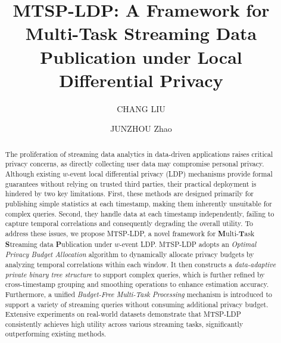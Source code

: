 \documentclass[acmsmall]{acmart}
\begin{document}
\title{MTSP-LDP: A Framework for Multi-Task Streaming Data
Publication under Local Differential Privacy}


\author{CHANG LIU}

\author{JUNZHOU Zhao}

\renewcommand{\shortauthors}{Liu and Zhao}

\begin{abstract}
The proliferation of streaming data analytics in data-driven applications raises
critical privacy concerns, as directly collecting user data may compromise
personal privacy.
Although existing $w$-event local differential privacy (LDP) mechanisms provide
formal guarantees without relying on trusted third parties, their practical
deployment is hindered by two key limitations.
First, these methods are designed primarily for publishing simple statistics at
each timestamp, making them inherently unsuitable for complex queries.
Second, they handle data at each timestamp independently, failing to capture
temporal correlations and consequently degrading the overall utility. To address these issues, we propose MTSP-LDP, a novel framework for
\textbf{M}ulti-\textbf{T}ask \textbf{S}treaming data \textbf{P}ublication under
$w$-event LDP.
MTSP-LDP adopts an \emph{Optimal Privacy Budget Allocation} algorithm to
dynamically allocate privacy budgets by analyzing temporal correlations within
each window.
It then constructs a \emph{data-adaptive private binary tree structure} to support complex queries, which is further refined by cross-timestamp grouping and smoothing operations to enhance estimation accuracy.
Furthermore, a unified \emph{Budget-Free Multi-Task Processing} mechanism is
introduced to support a variety of streaming queries without consuming additional privacy budget.
Extensive experiments on real-world datasets demonstrate that MTSP-LDP
consistently achieves high utility across various streaming tasks, significantly outperforming existing methods.
\end{abstract}
\end{document}
